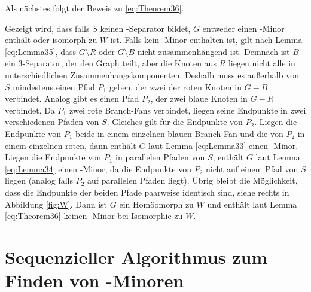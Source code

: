 Als nächstes folgt der Beweis zu \ref{eq:Theorem36}.
\begin{beweis}
  Gezeigt wird, dass falls $S$ keinen \dd-Separator bildet, $G$ entweder einen \kf-Minor enthält oder isomorph zu $W$ ist.
  Falls kein \kf-Minor enthalten ist, gilt nach Lemma \ref{eq:Lemma35}, dass $G \setminus R$ oder $G \setminus B$ nicht zusammenhängend ist.
  Demnach ist $B$ ein $3$-Separator, der den Graph teilt, aber die Knoten aus $R$ liegen nicht alle in unterschiedlichen Zusammenhangskomponenten.
  Deshalb muss es außerhalb von $S$ mindestens einen Pfad $P_1$ geben, der zwei der roten Knoten in $G - B$ verbindet.
  Analog gibt es einen Pfad $P_2$, der zwei blaue Knoten in $G - R$ verbindet.
  Da $P_1$ zwei rote Branch-Fans verbindet, liegen seine Endpunkte in zwei verschiedenen Pfaden von $S$.
  Gleiches gilt für die Endpunkte von $P_2$.
  Liegen die Endpunkte von $P_1$ beide in einem einzelnen blauen Branch-Fan und die von $P_2$ in einem einzelnen roten, dann enthält $G$ laut Lemma \ref{eq:Lemma33} einen \kf-Minor.
  Liegen die Endpunkte von $P_1$ in parallelen Pfaden von $S$, enthält $G$ laut Lemma \ref{eq:Lemma34} einen \kf-Minor, da die Endpunkte von $P_2$ nicht auf einem Pfad von $S$ liegen (analog falls $P_2$ auf parallelen Pfaden liegt).
  Übrig bleibt die Möglichkeit, dass die Endpunkte der beiden Pfade paarweise identisch sind, siehe rechts in Abbildung \ref{fig:W}.
  Dann ist $G$ ein Homöomorph zu $W$ und enthält laut Lemma \ref{eq:Theorem36} keinen \kf-Minor bei Isomorphie zu $W$.
\end{beweis}


\section{Sequenzieller Algorithmus zum Finden von \kf-Minoren}
\label{sec:sequenzieller_algorithmus_zum_finden_von_kf_minoren}

